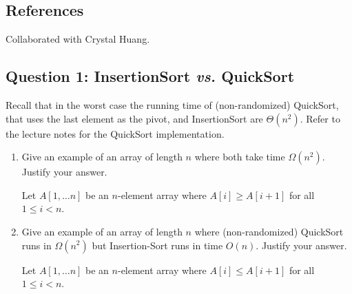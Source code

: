 \def\lc{\left\lceil}   
\def\rc{\right\rceil}
\runningheadrule
\firstpageheadrule
\cfoot{}
\subsection*{References}
Collaborated with Crystal Huang.
\subsection*{Question 1: {\sc InsertionSort} \textit{vs.} {\sc QuickSort}}

Recall that in the worst case the running time of (non-randomized) {\sc QuickSort}, that uses the last element as the pivot, and {\sc InsertionSort} are $\Theta(n^2)$. Refer to the lecture notes for the {\sc QuickSort} implementation.

\begin{enumerate}
    \item Give an example of an array of length $n$ where both take time $\Omega(n^2)$. Justify your answer.  
\begin{solution}
Let $A[1,\dots n]$ be an $n$-element array where $A[i]\geq A[i+1]$ for all $1\leq i<n$.
\end{solution}
    \item Give an example of an array of length $n$ where (non-randomized) {\sc QuickSort} runs in $\Omega(n^2)$ but {\sc Insertion-Sort} runs in time $O(n)$. Justify your answer. 
\begin{solution}
Let $A[1,\dots n]$ be an $n$-element array where $A[i]\leq A[i+1]$ for all $1\leq i<n$.
\end{solution}
\end{enumerate}
\newpage
